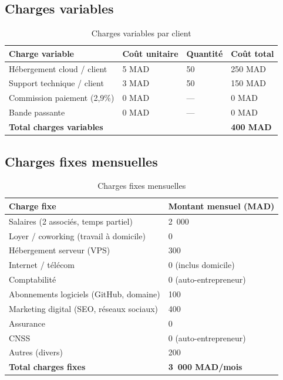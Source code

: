 \documentclass[12pt,a4paper]{report}
\newcommand{\hdr}[1]{\cellcolor{gray!15}\textbf{#1}}
\newcommand{\rowA}{\rowcolor{gray!8}}
\begin{document}
\subsection{Charges variables}

\begin{table}[H]
\centering
\caption{Charges variables par client}
\begin{tabular}{p{5cm}p{2.5cm}p{2.5cm}p{2.5cm}}
\toprule
\hdr{Charge variable} & \hdr{Coût unitaire} & \hdr{Quantité} & \hdr{Coût total} \\
\midrule
Hébergement cloud / client & 5 MAD & 50 & 250 MAD \\
\rowA Support technique / client & 3 MAD & 50 & 150 MAD \\
Commission paiement (2,9\%) & 0 MAD & --- & 0 MAD \\
\rowA Bande passante & 0 MAD & --- & 0 MAD \\
\midrule
\rowcolor{gray!12}\textbf{Total charges variables} & & & \textbf{400 MAD} \\
\bottomrule
\end{tabular}
\end{table}

\subsection{Charges fixes mensuelles}

\begin{table}[H]
\centering
\caption{Charges fixes mensuelles}
\begin{tabular}{p{6cm}p{4cm}}
\toprule
\hdr{Charge fixe} & \hdr{Montant mensuel (MAD)} \\
\midrule
Salaires (2 associés, temps partiel) & 2~000 \\
\rowA Loyer / coworking (travail à domicile) & 0 \\
Hébergement serveur (VPS) & 300 \\
\rowA Internet / télécom & 0 (inclus domicile) \\
Comptabilité & 0 (auto-entrepreneur) \\
\rowA Abonnements logiciels (GitHub, domaine) & 100 \\
Marketing digital (SEO, réseaux sociaux) & 400 \\
\rowA Assurance & 0 \\
CNSS & 0 (auto-entrepreneur) \\
\rowA Autres (divers) & 200 \\
\midrule
\rowcolor{gray!12}\textbf{Total charges fixes} & \textbf{3~000 MAD/mois} \\
\bottomrule
\end{tabular}
\end{table}
\end{document}
